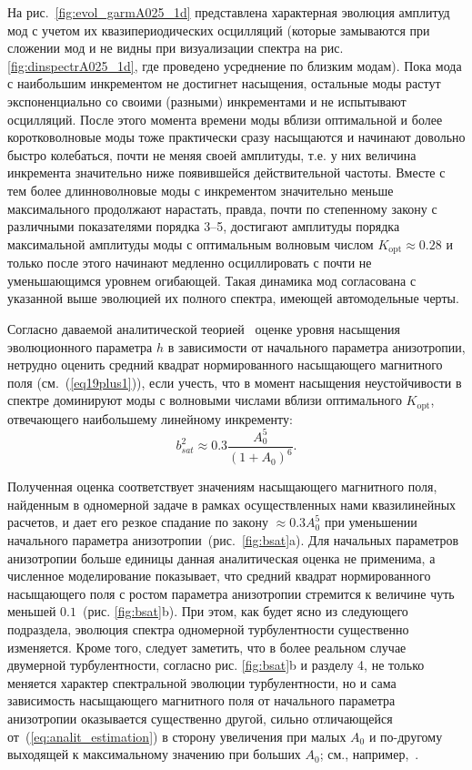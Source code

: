 На рис.~\ref{fig:evol_garmA025_1d} представлена характерная эволюция амплитуд мод с учетом их квазипериодических осцилляций (которые замываются при сложении мод и не видны при визуализации спектра на рис. \ref{fig:dinspectrA025_1d}, где проведено усреднение по близким модам). Пока мода с наибольшим инкрементом не достигнет насыщения, остальные моды растут экспоненциально со своими (разными) инкрементами и не испытывают осцилляций. После этого момента времени моды вблизи оптимальной и более коротковолновые моды тоже практически сразу насыщаются и начинают довольно быстро колебаться, почти не меняя своей амплитуды, т.е. у них величина инкремента значительно ниже появившейся действительной частоты. Вместе с тем более длинноволновые моды с инкрементом значительно меньше максимального продолжают нарастать, правда, почти по степенному закону с различными показателями порядка 3--5, достигают амплитуды порядка максимальной амплитуды моды с оптимальным волновым числом $K_\mathrm{opt}\approx0.28$ и только после этого начинают медленно осциллировать с почти не уменьшающимся уровнем огибающей. Такая динамика мод согласована с указанной выше эволюцией их полного спектра, имеющей автомодельные черты.

Согласно даваемой аналитической теорией~\cite{Pokhotelov2011} оценке уровня насыщения эволюционного параметра $h$ в зависимости от начального параметра анизотропии, нетрудно оценить средний квадрат нормированного насыщающего магнитного поля (см.~(\ref{eq19plus1})), если учесть, что в момент насыщения неустойчивости в спектре доминируют моды с волновыми числами вблизи оптимального $K_\mathrm{opt}$, отвечающего наибольшему линейному инкременту:
\begin{equation}
\label{eq:analit_estimation}
b_{sat}^2\approx0.3\dfrac{A_0^5}{(1+A_0)^6} .
\end{equation}

Полученная оценка соответствует значениям насыщающего магнитного поля, найденным в одномерной задаче в рамках осуществленных нами квазилинейных расчетов, и дает его резкое спадание по закону $\approx 0.3 A_0^5$ при уменьшении начального параметра анизотропии~(рис.~\ref{fig:bsat}a). Для начальных параметров анизотропии больше единицы данная аналитическая оценка не применима, а численное моделирование показывает, что средний квадрат нормированного насыщающего поля с ростом параметра анизотропии стремится к величине чуть меньшей $0.1$~(рис. \ref{fig:bsat}b). При этом, как будет ясно из следующего подраздела, эволюция спектра одномерной турбулентности существенно изменяется. Кроме того, следует заметить, что в более реальном случае двумерной турбулентности, согласно рис. \ref{fig:bsat}b и разделу 4, не только меняется характер спектральной эволюции турбулентности, но и сама зависимость насыщающего магнитного поля от начального параметра анизотропии оказывается существенно другой, сильно отличающейся от~(\ref{eq:analit_estimation}) в сторону увеличения при малых $A_0$ и по-другому выходящей к максимальному значению при больших $A_0$; см., например,~\cite{Borodachev2010,Kuznetsov2022}. 


